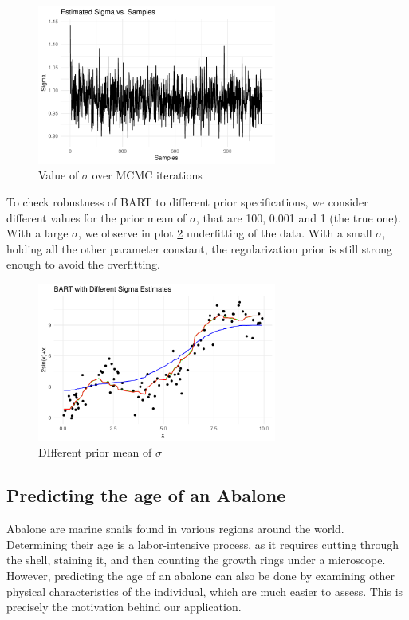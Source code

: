 \documentclass[a4paper,11pt]{article}
\begin{document}
\begin{figure}
  \centering
  \includegraphics[width=0.7\textwidth]{../outputs/sigma_plot.pdf}
  \caption{Value of $\sigma$ over MCMC iterations}
  \label{plot_sin2}
\end{figure}


To check robustness of BART to different prior specifications, we consider different values for the prior mean of $\sigma$,  that are 100, 0.001 and 1 (the true one). With a large $\sigma$, we observe in plot \ref{plot_sin3} underfitting of the data. With a small $\sigma$, holding all the other parameter constant, the regularization prior is still strong enough to avoid the overfitting.

\begin{figure}
  \centering
  \includegraphics[width=0.7\textwidth]{../outputs/sin_plot_diff_sigma.pdf}
  \caption{DIfferent prior mean of $\sigma$}
  \label{plot_sin3}
\end{figure}


\subsection{Predicting the age of an Abalone}

Abalone are marine snails found in various regions around the world. Determining their age is a labor-intensive process, as it requires cutting through the shell, staining it, and then counting the growth rings under a microscope. However, predicting the age of an abalone can also be done by examining other physical characteristics of the individual, which are much easier to assess. This is precisely the motivation behind our application.
\end{document}
